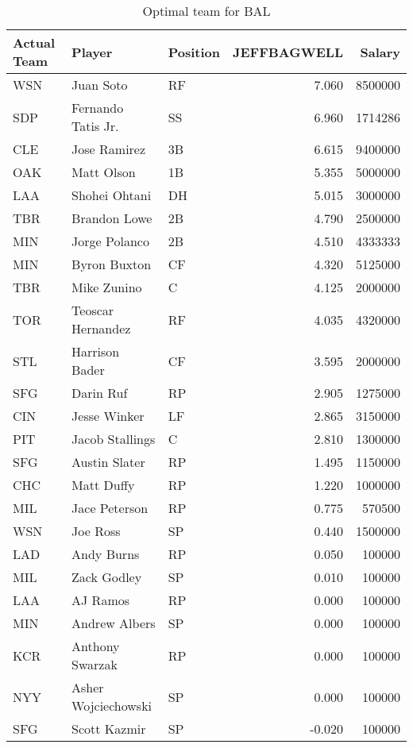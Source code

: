 \begin{table}

\caption{Optimal team for BAL}
\centering
\begin{tabular}[t]{l|l|l|r|r}
\hline
Actual Team & Player & Position & JEFFBAGWELL & Salary\\
\hline
WSN & Juan Soto & RF & 7.060 & 8500000\\
\hline
SDP & Fernando Tatis Jr. & SS & 6.960 & 1714286\\
\hline
CLE & Jose Ramirez & 3B & 6.615 & 9400000\\
\hline
OAK & Matt Olson & 1B & 5.355 & 5000000\\
\hline
LAA & Shohei Ohtani & DH & 5.015 & 3000000\\
\hline
TBR & Brandon Lowe & 2B & 4.790 & 2500000\\
\hline
MIN & Jorge Polanco & 2B & 4.510 & 4333333\\
\hline
MIN & Byron Buxton & CF & 4.320 & 5125000\\
\hline
TBR & Mike Zunino & C & 4.125 & 2000000\\
\hline
TOR & Teoscar Hernandez & RF & 4.035 & 4320000\\
\hline
STL & Harrison Bader & CF & 3.595 & 2000000\\
\hline
SFG & Darin Ruf & RP & 2.905 & 1275000\\
\hline
CIN & Jesse Winker & LF & 2.865 & 3150000\\
\hline
PIT & Jacob Stallings & C & 2.810 & 1300000\\
\hline
SFG & Austin Slater & RP & 1.495 & 1150000\\
\hline
CHC & Matt Duffy & RP & 1.220 & 1000000\\
\hline
MIL & Jace Peterson & RP & 0.775 & 570500\\
\hline
WSN & Joe Ross & SP & 0.440 & 1500000\\
\hline
LAD & Andy Burns & RP & 0.050 & 100000\\
\hline
MIL & Zack Godley & SP & 0.010 & 100000\\
\hline
LAA & AJ Ramos & RP & 0.000 & 100000\\
\hline
MIN & Andrew Albers & SP & 0.000 & 100000\\
\hline
KCR & Anthony Swarzak & RP & 0.000 & 100000\\
\hline
NYY & Asher Wojciechowski & SP & 0.000 & 100000\\
\hline
SFG & Scott Kazmir & SP & -0.020 & 100000\\
\hline
\end{tabular}
\end{table}
